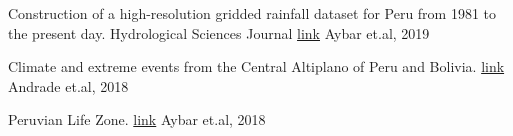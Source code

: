 \begin{cventries}
  \cventry
    {
    Construction of a high-resolution gridded rainfall dataset for Peru from 1981 to the present day. Hydrological Sciences Journal \textcolor{blue}{\href{https://www.tandfonline.com/doi/full/10.1080/02626667.2019.1649411}{link}}
    }
    {Aybar et.al, 2019}
    { }
    { }
    {
      \begin{cvitems}
      \end{cvitems}
    }
    \vspace{-20}
\end{cventries}
\begin{cventries}
  \cventry
    {
    Climate and extreme events from the Central Altiplano of Peru and Bolivia. 
    \textcolor{blue}{\href{https://boris.unibe.ch/108978/1/GB_Climate_Atlas_Altiplano_lores.pdf}{link}}
    }
    {Andrade et.al, 2018}
    { }
    { }
    {
      \begin{cvitems}
      \end{cvitems}
    }
    \vspace{-20}
\end{cventries}
\begin{cventries}
  \cventry
    {
    Peruvian Life Zone. 
    \textcolor{blue}{\href{https://www.senamhi.gob.pe/load/file/01402SENA-9.pdf}{link}}
    }
    {Aybar et.al, 2018}
    { }
    { }
    {
      \begin{cvitems}
      \end{cvitems}
    }
    \vspace{-20}
\end{cventries}
